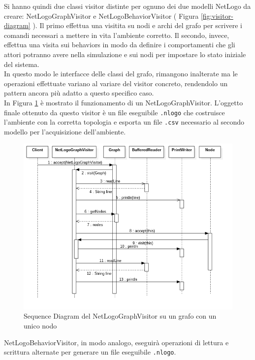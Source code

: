 Si hanno quindi due classi visitor distinte per ognuno dei due modelli NetLogo da creare: NetLogoGraphVisitor e NetLogoBehaviorVisitor ( Figura \ref{fig:visitor-diagram} ). Il primo effettua una visitita su nodi e archi del grafo per scrivere i comandi necessari a mettere in vita l'ambiente corretto. Il secondo, invece, effettua una visita sui behaviors in modo da definire i comportamenti che gli attori potranno avere nella simulazione e sui nodi per impostare lo stato iniziale del sistema.\\
In questo modo le interfacce delle classi del grafo, rimangono inalterate ma le operazioni effettuate variano al variare del visitor concreto, rendendolo un pattern ancora più adatto a questo specifico caso.\\
In Figura \ref{fig:visitor-sequence} è mostrato il funzionamento di un NetLogoGraphVisitor. L'oggetto finale ottenuto da questo visitor è un file eseguibile \texttt{.nlogo} che costruisce l'ambiente con la corretta topologia e esporta un file \texttt{.csv} necessario al secondo modello per l'acquisizione dell'ambiente.\\
\begin{figure}[htbp]
\centering
\includegraphics[width=\textwidth,height=\textheight,keepaspectratio]{images/visitor-sequence.png}
\caption{Sequence Diagram del NetLogoGraphVisitor su un grafo con un unico nodo}
\label{fig:visitor-sequence}
\end{figure}
NetLogoBehaviorVisitor, in modo analogo, eseguirà operazioni di lettura e scrittura alternate per generare un file eseguibile \texttt{.nlogo}.

